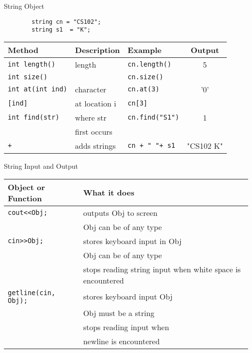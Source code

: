 \documentclass[xcolor={dvipsnames}]{beamer}
\begin{document}
\begin{frame}[fragile]{String Object}
		\huge
		\begin{verbatim}
		string cn = "CS102";
		string s1  = "K";
		\end{verbatim}
	\normalsize 

	\begin{tabular}{| l| l | l | c |}
		\hline
		 \textbf{Method}& \textbf{Description} & \textbf{Example} & \textbf{Output}\\

		\hline
		\texttt{int length()} & length & \texttt{cn.length()} & 5\\
		\texttt{int size()} &  & \texttt{cn.size()} & \\
		\hline
		\texttt{int at(int ind)} & character & \texttt{cn.at(3)} & '0'\\
		\texttt{[ind]}&  at location i & \texttt{cn[3]}  &\\

		\hline
		\texttt{int find(str)} & where str & \texttt{cn.find("S1")} & 1\\
					& first occurs& &\\
		\hline
		\texttt{+} & adds strings & \texttt{cn + " "+ s1} & "CS102 K"\\
		\hline
	\end{tabular}
\end{frame}

\begin{frame}{String Input and Output}
	\begin{tabularx}{\textwidth}{| l | X |}
		\hline
		\textbf{Object or Function} & \textbf{What it does}\\
		\hline
		\texttt{cout<<Obj;}& outputs Obj to screen\\
					      & Obj can be of any type\\
		\hline
		\texttt{cin>>Obj;} & stores keyboard input in Obj \\
					    & Obj can be of any type\\
				 	    & stops reading string input when white space is encountered\\
		\hline
		\texttt{getline(cin, Obj);} & stores keyboard input Obj\\
							& Obj must be a string\\
							    & stops reading input when\\
							    & newline is encountered\\
							   
		\hline
	\end{tabularx}
\end{frame}
\end{document}
